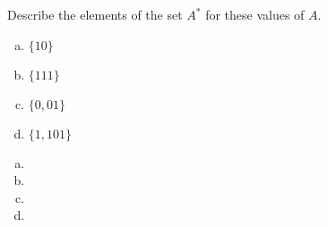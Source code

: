 \documentclass[../main.tex]{subfiles}
\begin{document}
Describe the elements of the set $A^\ast$ for these values of $A$.
\begin{enumerate}[a)]
	\item $\{10\}$
	\item $\{111\}$
	\item $\{0, 01\}$
	\item $\{1, 101\}$
\end{enumerate}

\solution
\begin{enumerate}[a)]
	\item 
	\item 
	\item 
	\item 
\end{enumerate}
\end{document}
